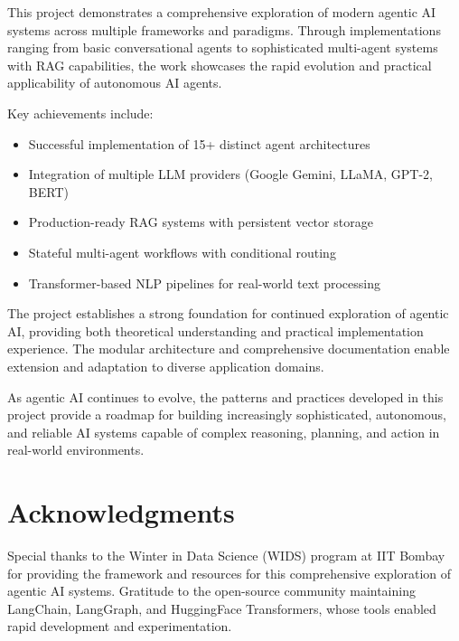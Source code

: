 \documentclass[12pt,a4paper]{article}
\begin{document}
This project demonstrates a comprehensive exploration of modern agentic AI systems across multiple frameworks and paradigms. Through implementations ranging from basic conversational agents to sophisticated multi-agent systems with RAG capabilities, the work showcases the rapid evolution and practical applicability of autonomous AI agents.

Key achievements include:
\begin{itemize}
    \item Successful implementation of 15+ distinct agent architectures
    \item Integration of multiple LLM providers (Google Gemini, LLaMA, GPT-2, BERT)
    \item Production-ready RAG systems with persistent vector storage
    \item Stateful multi-agent workflows with conditional routing
    \item Transformer-based NLP pipelines for real-world text processing
\end{itemize}

The project establishes a strong foundation for continued exploration of agentic AI, providing both theoretical understanding and practical implementation experience. The modular architecture and comprehensive documentation enable extension and adaptation to diverse application domains.

As agentic AI continues to evolve, the patterns and practices developed in this project provide a roadmap for building increasingly sophisticated, autonomous, and reliable AI systems capable of complex reasoning, planning, and action in real-world environments.

\section*{Acknowledgments}

Special thanks to the Winter in Data Science (WIDS) program at IIT Bombay for providing the framework and resources for this comprehensive exploration of agentic AI systems. Gratitude to the open-source community maintaining LangChain, LangGraph, and HuggingFace Transformers, whose tools enabled rapid development and experimentation.
\end{document}
